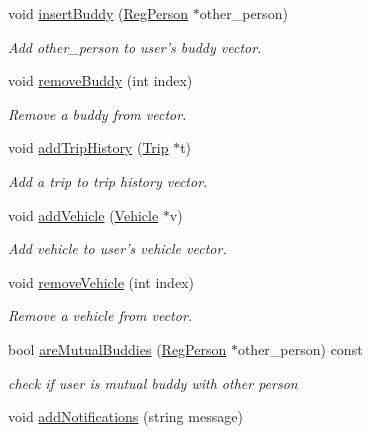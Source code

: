 \begin{DoxyCompactItemize}
void \hyperlink{class_reg_person_ab3aceab8edc0a7a68dcb56184709cea3}{insert\+Buddy} (\hyperlink{class_reg_person}{Reg\+Person} $\ast$other\+\_\+person)
\begin{DoxyCompactList}\small\item\em Add other\+\_\+person to user's buddy vector. \end{DoxyCompactList}\item 
void \hyperlink{class_reg_person_af84c947ee794a662d27b6437edfb16f5}{remove\+Buddy} (int index)
\begin{DoxyCompactList}\small\item\em Remove a buddy from vector. \end{DoxyCompactList}\item 
\hypertarget{class_reg_person_ac3ba518d24465719eb3e10ab8689d380}{void \hyperlink{class_reg_person_ac3ba518d24465719eb3e10ab8689d380}{add\+Trip\+History} (\hyperlink{class_trip}{Trip} $\ast$t)}\label{class_reg_person_ac3ba518d24465719eb3e10ab8689d380}

\begin{DoxyCompactList}\small\item\em Add a trip to trip history vector. \end{DoxyCompactList}\item 
void \hyperlink{class_reg_person_a1e4f00c8000681e45b95bbf8b91e2e98}{add\+Vehicle} (\hyperlink{class_vehicle}{Vehicle} $\ast$v)
\begin{DoxyCompactList}\small\item\em Add vehicle to user's vehicle vector. \end{DoxyCompactList}\item 
void \hyperlink{class_reg_person_afa8a8ed022555e8b0c780712627f5c25}{remove\+Vehicle} (int index)
\begin{DoxyCompactList}\small\item\em Remove a vehicle from vector. \end{DoxyCompactList}\item 
bool \hyperlink{class_reg_person_a33a4f3d04487aa4857a791d82e967e98}{are\+Mutual\+Buddies} (\hyperlink{class_reg_person}{Reg\+Person} $\ast$other\+\_\+person) const 
\begin{DoxyCompactList}\small\item\em check if user is mutual buddy with other person \end{DoxyCompactList}\item 
\hypertarget{class_reg_person_a7ad9eadc18f0f9492c3bcaca195bd08d}{void \hyperlink{class_reg_person_a7ad9eadc18f0f9492c3bcaca195bd08d}{add\+Notifications} (string message)}\label{class_reg_person_a7ad9eadc18f0f9492c3bcaca195bd08d}


\end{DoxyCompactItemize}
